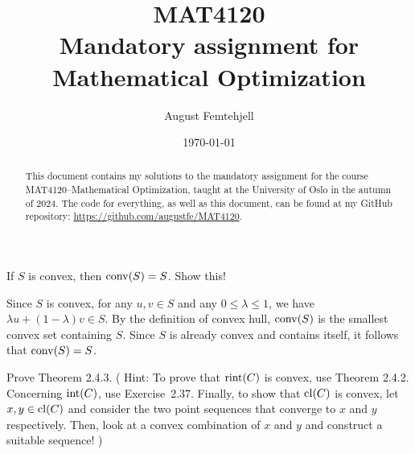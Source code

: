 \documentclass[
  a4paper,
  12pt,
]{article}
\title{
  MAT4120\\
  \small{Mandatory assignment for Mathematical Optimization}
}
\author{August Femtehjell}
\date{\today}
\numberwithin{equation}{section}
\begin{document}
\maketitle

\tableofcontents

\begin{abstract}
  This document contains my solutions to the mandatory assignment for the course MAT4120--Mathematical Optimization, taught at the University of Oslo in the autumn of 2024.
  The code for everything, as well as this document, can be found at my GitHub repository: \url{https://github.com/augustfe/MAT4120}.
\end{abstract}

\setcounter{section}{2}

\begin{exercise}
  If $S$ is convex, then $\operatorname*{conv}(S) = S$.
  Show this!
\end{exercise}

\begin{solution}
  Since $S$ is convex, for any $u, v \in S$ and any $0 \leq \lambda \leq 1$, we have $\lambda u + (1 - \lambda) v \in S$.
  By the definition of convex hull, $\operatorname*{conv}(S)$ is the smallest convex set containing $S$.
  Since $S$ is already convex and contains itself, it follows that $\operatorname*{conv}(S) = S$.
\end{solution}


\begin{exercise}
  Prove Theorem 2.4.3.
  (%
    Hint: To prove that $\operatorname*{rint}(C)$ is convex, use Theorem 2.4.2.
    Concerning $\operatorname*{int}(C)$, use Exercise~2.37.
    Finally, to show that $\operatorname*{cl}(C)$ is convex, let $x, y \in \operatorname*{cl}(C)$ and consider the two point sequences that converge to $x$ and $y$ respectively.
    Then, look at a convex combination of $x$ and $y$ and construct a suitable sequence!%
  )
\end{exercise}
\end{document}
